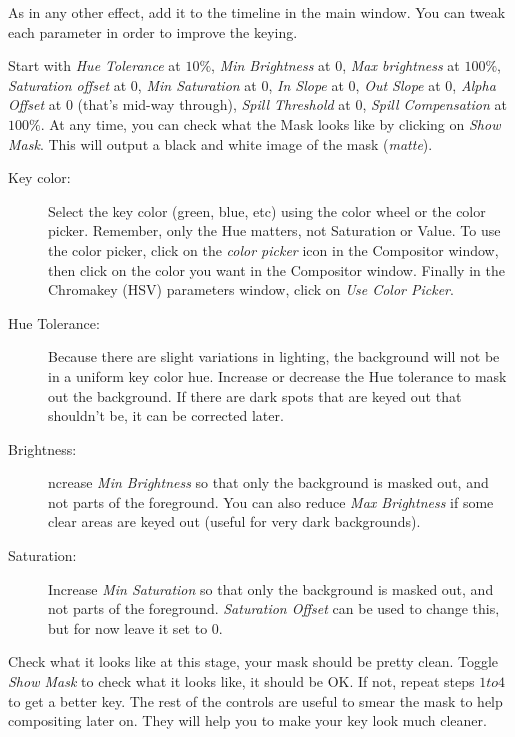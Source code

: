 As in any other effect, add it to the timeline in the main window. You can tweak each parameter in order to improve the keying.

Start with \textit{Hue Tolerance} at $10\%$, \textit{Min Bright\-ness} at $0$, \textit{Max bright\-ness} at $100\%$, \textit{Saturation offset} at $0$, \textit{Min Saturation} at $0$, \textit{In Slope} at $0$, \textit{Out Slope} at $0$, \textit{Alpha Offset} at $0$ (that’s mid-way through), \textit{Spill Threshold} at $0$, \textit{Spill Compensation} at $100\%$. At any time, you can check what the Mask looks like by clicking on \textit{Show Mask}. This will output a black and white image of the mask (\textit{matte}).

\begin{description}
    \item[Key color:] Select the key color (green, blue, etc) using the color wheel or the color picker. Remember, only the Hue matters, not Saturation or Value. To use the color picker, click on the \textit{color picker} icon in the Compositor window, then click on the color you want in the Compositor window. Finally  in the Chromakey (HSV) parameters window, click on \textit{Use Color Picker}.
    \item[Hue Tolerance:] Because there are slight variations in lighting, the background will not be in a uniform key color hue. Increase or decrease the Hue tolerance to mask out the background. If there are dark spots that are keyed out that shouldn’t be, it can be corrected later.
    \item[Brightness:] ncrease \textit{Min Brightness} so that only the background is masked out, and not parts of the foreground. You can also reduce \textit{Max Brightness} if some clear areas are keyed out (useful for very dark backgrounds).
    \item[Saturation:] Increase \textit{Min Saturation} so that only the background is masked out, and not parts of the foreground. \textit{Saturation Offset} can be used to change this, but for now leave it set to $0$.
\end{description}

Check what it looks like at this stage, your mask should be pretty
clean. Toggle \textit{Show Mask} to check what it looks like, it
should be OK\@. If not, repeat steps $1 to 4$ to get a better
key. The rest of the controls are useful to smear the mask to help
compositing later on. They will help you to make your key look much
cleaner.

